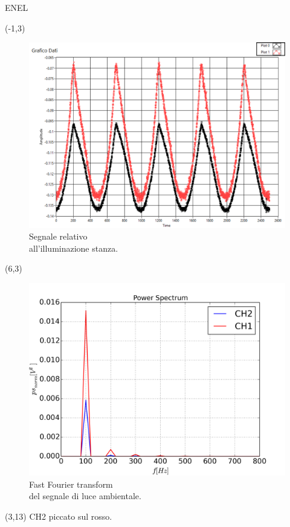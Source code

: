 \documentclass{beamer}
\begin{document}
\begin{frame}{ENEL}

\begin{textblock}{12}(-1,3)
\begin{figure}
\includegraphics[width=0.5\linewidth]{./luce_stanza_enel}
\caption{Segnale relativo\\
all'illuminazione stanza.}
\label{fig:enel}
\end{figure}
\end{textblock}

\begin{textblock}{12}(6,3)
\begin{figure}
\centering
\includegraphics[width=0.5\linewidth]{./fft_lucestanza}
\caption{Fast Fourier transform \\
del segnale di luce ambientale.}
\label{fig:fft_lucestanza}
\end{figure}
\end{textblock}

\begin{textblock}{10}(3,13)
CH2 piccato sul rosso.
\end{textblock}

\end{frame}
\end{document}

